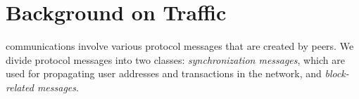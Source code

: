 \section{Background on \bc  Traffic}\label{sec:back}

	 \bc communications involve various protocol messages that are created by \bc peers. 
	 We divide \bc protocol messages into two classes: \emph{synchronization messages},  which are used for  propagating user addresses and transactions in the \bc network, and \emph{block-related messages}.%
	
